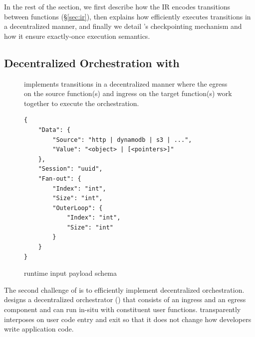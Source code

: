 In the rest of the section, we first describe how the \name{} IR encodes
transitions between functions (\S\ref{sec:ir}), then explains how \deorc{}
efficiently executes transitions in a decentralized manner, and finally we
detail \name{}'s checkpointing mechanism and how it ensure exactly-once
execution semantics. 





\subsection{Decentralized Orchestration with \deorc{}}\label{sec:runtime}

\begin{figure}[t!]
	\centering
	\caption{\deorc{} implements transitions in a decentralized manner where
the egress on the source function(s) and ingress on the target function(s)
work together to execute the orchestration. }
	\label{fig:transition}
\end{figure}

\begin{figure}[]
    \begin{verbatim}
{
    "Data": {
        "Source": "http | dynamodb | s3 | ...",
        "Value": "<object> | [<pointers>]"
    },
    "Session": "uuid",
    "Fan-out": {
        "Index": "int",
        "Size": "int",
        "OuterLoop": {
            "Index": "int",
            "Size": "int"
        }
    }
}
    \end{verbatim}
    \caption{\name{} runtime input payload schema}
    \label{fig:input-format}
\end{figure}

The second challenge of \name{} is to efficiently implement decentralized
orchestration. \name{} designs a decentralized orchestrator (\deorc) that
consists of an ingress and an egress component and can run in-situ with
constituent user functions. \deorc{} transparently interposes on user code
entry and exit so that it does not change how developers write application
code.

